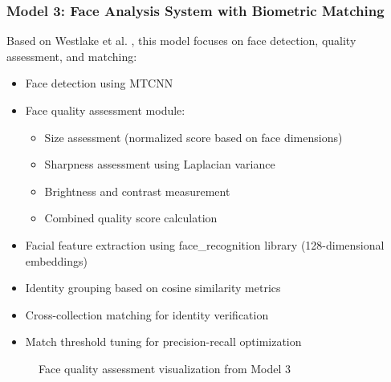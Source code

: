 \documentclass[conference,compsoc]{IEEEtran}
\begin{document}
\subsubsection{Model 3: Face Analysis System with Biometric Matching}
Based on Westlake et al. \cite{westlake2022}, this model focuses on face detection, quality assessment, and matching:
\begin{itemize}
    \item Face detection using MTCNN
    \item Face quality assessment module:
        \begin{itemize}
            \item Size assessment (normalized score based on face dimensions)
            \item Sharpness assessment using Laplacian variance
            \item Brightness and contrast measurement
            \item Combined quality score calculation
        \end{itemize}
    \item Facial feature extraction using face\_recognition library (128-dimensional embeddings)
    \item Identity grouping based on cosine similarity metrics
    \item Cross-collection matching for identity verification
    \item Match threshold tuning for precision-recall optimization
\end{itemize}

\begin{figure}[htbp]
\centering
\begin{minipage}{0.8\textwidth}
\end{minipage}
\caption{Face quality assessment visualization from Model 3}
\label{fig:face_quality}
\end{figure}
\end{document}
